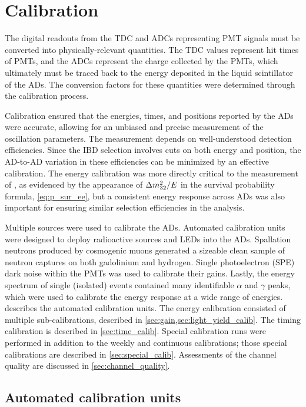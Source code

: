 \chapter{Calibration}
\label{ch:calibration}


The digital readouts from the TDC and ADCs representing PMT signals
must be converted into physically-relevant quantities.
The TDC values represent hit times of PMTs,
and the ADCs represent the charge collected by the PMTs,
which ultimately must be traced back to the energy deposited
in the liquid scintillator of the ADs.
The conversion factors for these quantities were determined
through the calibration process.

Calibration ensured that the energies, times, and positions
reported by the ADs were accurate,
allowing for an unbiased and precise measurement
of the oscillation parameters.
The \thetaot{} measurement depends on well-understood detection efficiencies.
Since the IBD selection involves cuts on both energy and position,
the AD-to-AD variation in these efficiencies can be minimized
by an effective calibration.
The energy calibration was more directly critical to the measurement
of \dmsquared{}, as evidenced by the appearance of $\Delta m^2_{32}/E$
in the survival probability formula, \cref{eq:p_sur_ee},
but a consistent energy response across ADs
was also important for ensuring similar selection efficiencies
in the \thetaot{} analysis.

Multiple sources were used to calibrate the ADs.
Automated calibration units were designed to deploy radioactive sources
and LEDs into the ADs.
Spallation neutrons produced by cosmogenic muons
generated a sizeable clean sample of neutron captures
on both gadolinium and hydrogen.
Single photoelectron (SPE) dark noise within the PMTs
was used to calibrate their gains.
Lastly, the energy spectrum of single (isolated) events
contained many identifiable $\alpha$ and $\gamma$ peaks,
which were used to calibrate the energy response at a wide range of energies.
 describes the automated calibration units.
The energy calibration consisted of multiple sub-calibrations,
described in \cref{sec:gain,sec:light_yield_calib}.
The timing calibration is described in \cref{sec:time_calib}.
Special calibration runs were performed in addition to
the weekly and continuous calibrations;
those special calibrations are described in \cref{sec:special_calib}.
Assessments of the channel quality are discussed in \cref{sec:channel_quality}.

\section{Automated calibration units}
\label{sec:acus}

